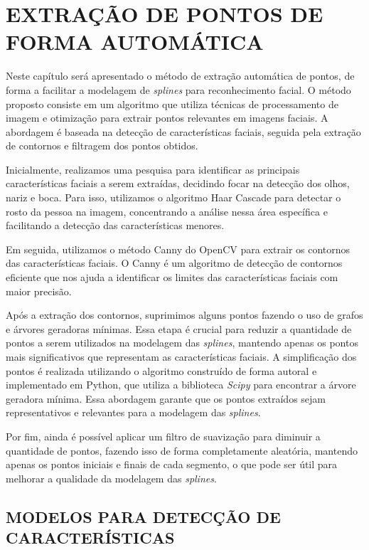 \chapter{EXTRAÇÃO DE PONTOS DE FORMA AUTOMÁTICA} \label{cha:processamento-imagem} 

Neste capítulo será apresentado o método de extração automática de pontos, de forma a facilitar a modelagem de \textit{splines} para reconhecimento facial. O método proposto consiste em um algoritmo que utiliza técnicas de processamento de imagem e otimização para extrair pontos relevantes em imagens faciais. A abordagem é baseada na detecção de características faciais, seguida pela extração de contornos e filtragem dos pontos obtidos.

Inicialmente, realizamos uma pesquisa para identificar as principais características faciais a serem extraídas, decidindo focar na detecção dos olhos, nariz e boca. Para isso, utilizamos o algoritmo Haar Cascade \cite{BoostedCascade} para detectar o rosto da pessoa na imagem, concentrando a análise nessa área específica e facilitando a detecção das características menores.

Em seguida, utilizamos o método Canny do OpenCV \cite{CannyAplicacao, Canny} para extrair os contornos das características faciais. O Canny é um algoritmo de detecção de contornos eficiente que nos ajuda a identificar os limites das características faciais com maior precisão.

Após a extração dos contornos, suprimimos alguns pontos fazendo o uso de grafos e árvores geradoras mínimas. Essa etapa é crucial para reduzir a quantidade de pontos a serem utilizados na modelagem das \textit{splines}, mantendo apenas os pontos mais significativos que representam as características faciais. A simplificação dos pontos é realizada utilizando o algoritmo construído de forma autoral e implementado em Python, que utiliza a biblioteca \textit{Scipy} \cite{Scipy} para encontrar a árvore geradora mínima. Essa abordagem garante que os pontos extraídos sejam representativos e relevantes para a modelagem das \textit{splines}.

Por fim, ainda é possível aplicar um filtro de suavização para diminuir a quantidade de pontos, fazendo isso de forma completamente aleatória, mantendo apenas os pontos iniciais e finais de cada segmento, o que pode ser útil para melhorar a qualidade da modelagem das \textit{splines}.

\section{MODELOS PARA DETECÇÃO DE CARACTERÍSTICAS}


